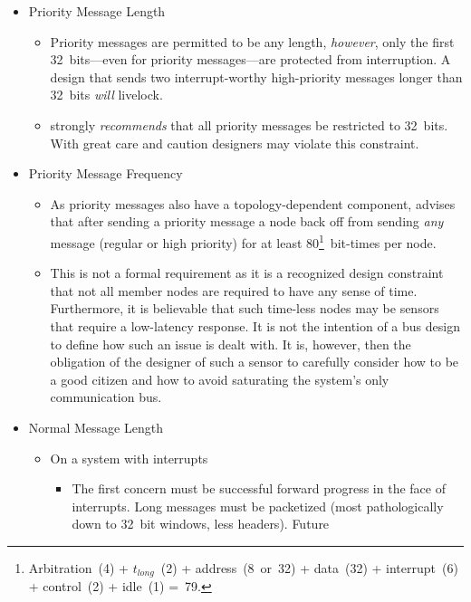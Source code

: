 \begin{itemize}
  \item{Priority Message Length}
  \begin{itemize}
    \item Priority messages are permitted to be any length, {\em however}, only
          the first 32~bits---even for priority messages---are protected from
          interruption. A design that sends two interrupt-worthy high-priority
          messages longer than 32~bits {\em will} livelock.
    \item \bus strongly {\em recommends} that all priority messages be
          restricted to 32~bits. With great care and caution designers may
          violate this constraint.
  \end{itemize}
  \item{Priority Message Frequency}
  \begin{itemize}
    \item As priority messages also have a topology-dependent component, \bus
          advises that after sending a priority message a node back off from
          sending {\em any} message (regular or high priority) for at least
          80\footnote{
            Arbitration~(4) + $t_{long}$~(2) + address~(8~or~32) + data~(32) +
            interrupt~(6) + control~(2) + idle~(1) =~79.
          }~bit-times per \bus node.
    \item This is not a formal \bus requirement as it is a recognized design
          constraint that not all member nodes are required to have any sense
          of time. Furthermore, it is believable that such time-less nodes may
          be sensors that require a low-latency response. It is not the
          intention of a bus design to define how such an issue is dealt with.
          It is, however, then the obligation of the designer of such a sensor
          to carefully consider how to be a good \bus citizen and how to avoid
          saturating the system's only communication bus.
  \end{itemize}
  \item{Normal Message Length}
  \begin{itemize}
    \item On a system with interrupts
    \begin{itemize}
      \item The first concern must be successful forward progress in the face
            of interrupts. Long messages must be packetized (most
            pathologically down to 32~bit windows, less headers). Future \bus

\end{itemize}
\end{itemize}
\end{itemize}

